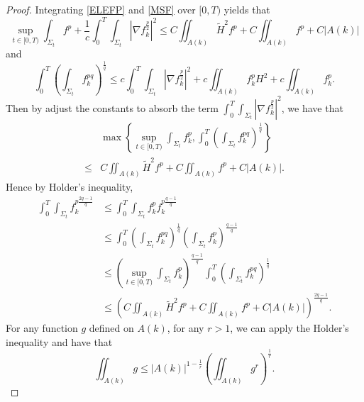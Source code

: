 \begin{proof}
    Integrating \autoref{ELEFP} and \autoref{MSF} over $[0,T)$ yields that 
    \begin{equation*}
        \sup _{t \in [0,T)} \int_{\Sigma_t} f^p + \frac{1}{c} \int_{0}^{T}\int_{\Sigma_t} \left| \nabla f_{k}^{\frac{p}{2}}  \right| ^2 \leq C \iint_{A(k)}^{} \tilde{H}^2 f^p +C \iint_{A(k)}^{}f^p + C \left| A(k) \right| 
    \end{equation*}
    and
    \begin{equation*}
        \int_{0}^{T} \left(\int_{\Sigma_t} f_{k}^{pq} \right) ^{\frac{1}{q}} \leq c \int_{0}^{T}\int_{\Sigma_t} \left| \nabla f_{k}^{\frac{p}{2}} \right| ^2 + c \iint_{A(k)} f_{k}^{p} H^2 + c \iint_{A(k)} f_{k}^{p}.
    \end{equation*}
    Then by adjust the constants to absorb the term $\int_{0}^{T}\int_{\Sigma_t} \left| \nabla f_{k}^{\frac{p}{2}} \right| ^2$, we have that
    \begin{equation*}
    \begin{split}
        &\max \left\{ \sup _{t \in [0,T)} \int_{\Sigma_t} f_{k}^{p}, \int_{0}^{T} \left(\int_{\Sigma_t} f_{k}^{pq} \right) ^{\frac{1}{q}}  \right\} \\
        \leq &C \iint_{A(k)}^{} \tilde{H}^2 f^p +C \iint_{A(k)}^{}f^p + C \left| A(k) \right|. 
    \end{split}
    \end{equation*} 
    Hence by Holder's inequality,
    \begin{equation} \label{SIE}
    \begin{split}
        \int_{0}^{T} \int_{\Sigma_t} f_{k}^{p \frac{2q-1}{q}}  
    &\leq  \int_{0}^{T} \int_{\Sigma_t} f_{k}^{p} f_{k}^{p \frac{q-1}{q}}  \\
    & \leq \int_{0}^{T} \left( \int_{\Sigma_t} f_{k}^{pq}  \right) ^{\frac{1}{q}} \left( \int_{\Sigma_t} f_{k}^{p}  \right) ^{\frac{q-1}{q}}\\
    & \leq \left( \sup _{t \in [0,T)} \int_{\Sigma_t} f_{k}^{p} \right) ^{\frac{q-1}{q}}  \int_{0}^{T} \left(\int_{\Sigma_t} f_{k}^{pq} \right) ^{\frac{1}{q}} \\
    & \leq \left( C \iint_{A(k)}^{} \tilde{H}^2 f^p +C \iint_{A(k)}^{}f^p + C \left| A(k) \right| \right) ^{\frac{2q-1}{q}}.
    \end{split}
    \end{equation}
    For any function $g$ defined on $A(k)$, for any $r>1$, we can apply the Holder's inequality and have that \[\iint_{A(k)}^{}g \leq \left| A(k) \right| ^{1-\frac{1}{r}}\left( \iint_{A(k)}^{} g^r \right) ^{\frac{1}{r}}.\]

\end{proof}
